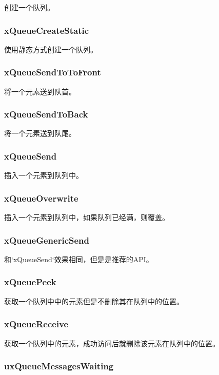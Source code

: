\documentclass[12pt, a4paper]{article}
\begin{document}
创建一个队列。

\subsubsection {xQueueCreateStatic}

使用静态方式创建一个队列。

\subsubsection {xQueueSendToToFront}

将一个元素送到队首。

\subsubsection {xQueueSendToBack}

将一个元素送到队尾。

\subsubsection {xQueueSend}

插入一个元素到队列中。

\subsubsection {xQueueOverwrite}

插入一个元素到队列中，如果队列已经满，则覆盖。

\subsubsection {xQueueGenericSend}

和`xQueueSend`效果相同，但是是推荐的API。

\subsubsection {xQueuePeek}

获取一个队列中中的元素但是不删除其在队列中的位置。

\subsubsection {xQueueReceive}

获取一个队列中的元素，成功访问后就删除该元素在队列中的位置。

\subsubsection {uxQueueMessagesWaiting}
\end{document}
